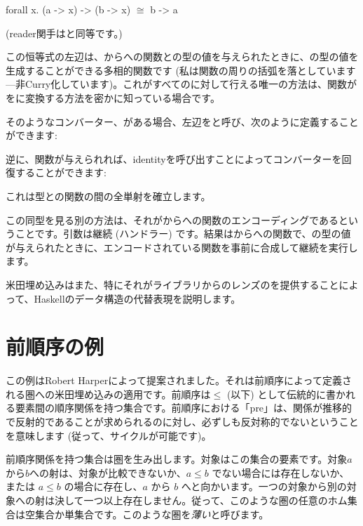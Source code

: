 \begin{snipv}
forall x. (a -> x) -> (b -> x) \ensuremath{\cong} b -> a
\end{snipv}
 (reader関手はと同等です。) 

この恒等式の左辺は、からへの関数との型の値を与えられたときに、の型の値を生成することができる多相的関数です (私は関数の周りの括弧を落としています---非Curry化しています)。これがすべてのに対して行える唯一の方法は、関数がをに変換する方法を密かに知っている場合です。

そのようなコンバーター、がある場合、左辺をと呼び、次のように定義することができます: 

逆に、関数が与えられれば、identityを呼び出すことによってコンバーターを回復することができます: 

これは型との関数の間の全単射を確立します。

この同型を見る別の方法は、それがからへの関数のエンコーディングであるということです。引数は継続 (ハンドラー) です。結果はからへの関数で、の型の値が与えられたときに、エンコードされている関数を事前に合成して継続を実行します。

米田埋め込みはまた、特にそれがライブラリからのレンズのを提供することによって、Haskellのデータ構造の代替表現を説明します。

\section{前順序の例}

この例はRobert Harperによって提案されました。それは前順序によって定義される圏への米田埋め込みの適用です。前順序は$\leqslant$ (以下) として伝統的に書かれる要素間の順序関係を持つ集合です。前順序における「pre」は、関係が推移的で反射的であることが求められるのに対し、必ずしも反対称的でないということを意味します (従って、サイクルが可能です)。

前順序関係を持つ集合は圏を生み出します。対象はこの集合の要素です。対象$a$から$b$への射は、対象が比較できないか、$a \leqslant b$ でない場合には存在しないか、または $a \leqslant b$ の場合に存在し、$a$ から $b$ へと向かいます。一つの対象から別の対象への射は決して一つ以上存在しません。従って、このような圏の任意のホム集合は空集合か単集合です。このような圏を\emph{薄い}と呼びます。

